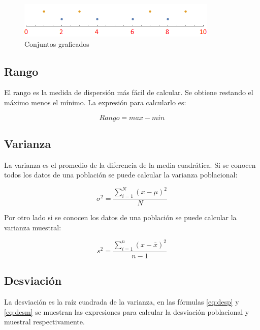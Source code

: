 \documentclass[]{book}
\begin{document}
\begin{figure}[h]

{\centering \includegraphics[width=0.5\linewidth]{rnl} 

}

\caption{Conjuntos graficados}\label{fig:rnl1}
\end{figure}

\subsection{Rango}\label{rango}

El rango es la medida de dispersión más fácil de calcular. Se obtiene
restando el máximo menos el mínimo. La expresión para calcularlo es:

\begin{equation} 
  Rango = max - min
  \label{eq:rg}
\end{equation}

\subsection{Varianza}\label{varianza}

La varianza es el promedio de la diferencia de la media cuadrática. Si
se conocen todos los datos de una población se puede calcular la
varianza poblacional:

\begin{equation} 
  \sigma^2 = \dfrac{\sum_{i=1}^{N}\left(x- \mu \right)^2}{N}
  \label{eq:varp}
\end{equation}

Por otro lado si se conocen los datos de una población se puede calcular
la varianza muestral:

\begin{equation} 
  s^2 = \dfrac{\sum_{i=1}^{n}\left(x- \bar{x} \right)^2}{n-1}
  \label{eq:varm}
\end{equation}

\subsection{Desviación}\label{desviacion}

La desviación es la raíz cuadrada de la varianza, en las fórmulas
\eqref{eq:desp} y \eqref{eq:desm} se muestran las expresiones para calcular
la desviación poblacional y muestral respectivamente.
\end{document}

